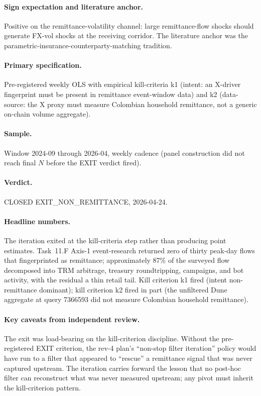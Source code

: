 \paragraph{Sign expectation and literature anchor.} Positive on the
remittance-volatility channel: large remittance-flow shocks should
generate FX-vol shocks at the receiving corridor. The literature anchor
was the parametric-insurance-counterparty-matching tradition.

\paragraph{Primary specification.} Pre-registered weekly OLS with
empirical kill-criteria k1 (intent: an X-driver fingerprint must be
present in remittance event-window data) and k2 (data-source: the X
proxy must measure Colombian household remittance, not a generic
on-chain volume aggregate).

\paragraph{Sample.} Window 2024-09 through 2026-04, weekly cadence
(panel construction did not reach final \(N\) before the EXIT verdict
fired).

\paragraph{Verdict.} CLOSED EXIT\_NON\_REMITTANCE, 2026-04-24.

\paragraph{Headline numbers.} The iteration exited at the kill-criteria
step rather than producing point estimates. Task~11.F Axis-1
event-research returned zero of thirty peak-day flows that fingerprinted
as remittance; approximately 87\% of the surveyed flow decomposed into
TRM arbitrage, treasury roundtripping, campaigns, and bot activity, with
the residual a thin retail tail. Kill criterion k1 fired (intent
non-remittance dominant); kill criterion k2 fired in part (the
unfiltered Dune aggregate at query 7366593 did not measure Colombian
household remittance).

\paragraph{Key caveats from independent review.} The exit was load-bearing
on the kill-criterion discipline. Without the pre-registered EXIT
criterion, the rev-4 plan's ``non-stop filter iteration'' policy would
have run to a filter that appeared to ``rescue'' a remittance signal
that was never captured upstream. The iteration carries forward the
lesson that no post-hoc filter can reconstruct what was never measured
upstream; any pivot must inherit the kill-criterion pattern.

